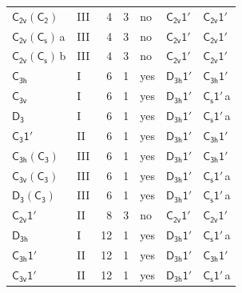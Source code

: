 \documentclass[10pt,a4paper]{article}
\numberwithin{equation}{section}
\newcommand{\grp}[1]{\mathsf{#1}}
\newcommand{\clsletter}[1]{\,{\scriptsize\color{black!55}#1}}
\begin{document}
{\begin{longtable}{@{}llrrlll@{}}
\href{C2v-C2.pdf}{$\grp{C_{2v}}(\grp{C_{2}})$} & III & 4 & 3 & no & \href{C2v-1p.pdf}{$\grp{C_{2v}1'}$} & \href{C2v-1p.pdf}{$\grp{C_{2v}1'}$}\\
\href{C2v-C1v.pdf}{$\grp{C_{2v}}(\grp{C_{s}})$}\clsletter{a} & III & 4 & 3 & no & \href{C2v-1p.pdf}{$\grp{C_{2v}1'}$} & \href{C2v-1p.pdf}{$\grp{C_{2v}1'}$}\\
\href{C2v-C1v.pdf}{$\grp{C_{2v}}(\grp{C_{s}})$}\clsletter{b} & III & 4 & 3 & no & \href{C2v-1p.pdf}{$\grp{C_{2v}1'}$} & \href{C2v-1p.pdf}{$\grp{C_{2v}1'}$}\\
\href{../../../rotation/data/pdf/C3h.pdf}{$\grp{C_{3h}}$} & I & 6 & 1 & yes & \href{D3h-1p.pdf}{$\grp{D_{3h}1'}$} & \href{C3h-1p.pdf}{$\grp{C_{3h}1'}$}\\
\href{../../../rotation/data/pdf/C3v.pdf}{$\grp{C_{3v}}$} & I & 6 & 1 & yes & \href{D3h-1p.pdf}{$\grp{D_{3h}1'}$} & \href{C1v-1p.pdf}{$\grp{C_{s}1'}$}\clsletter{a}\\
\href{../../../rotation/data/pdf/D3.pdf}{$\grp{D_{3}}$} & I & 6 & 1 & yes & \href{D3h-1p.pdf}{$\grp{D_{3h}1'}$} & \href{C1v-1p.pdf}{$\grp{C_{s}1'}$}\clsletter{a}\\
\href{C3-1p.pdf}{$\grp{C_{3}1'}$} & II & 6 & 1 & yes & \href{D3h-1p.pdf}{$\grp{D_{3h}1'}$} & \href{C3h-1p.pdf}{$\grp{C_{3h}1'}$}\\
\href{C3h-C3.pdf}{$\grp{C_{3h}}(\grp{C_{3}})$} & III & 6 & 1 & yes & \href{D3h-1p.pdf}{$\grp{D_{3h}1'}$} & \href{C3h-1p.pdf}{$\grp{C_{3h}1'}$}\\
\href{C3v-C3.pdf}{$\grp{C_{3v}}(\grp{C_{3}})$} & III & 6 & 1 & yes & \href{D3h-1p.pdf}{$\grp{D_{3h}1'}$} & \href{C1v-1p.pdf}{$\grp{C_{s}1'}$}\clsletter{a}\\
\href{D3-C3.pdf}{$\grp{D_{3}}(\grp{C_{3}})$} & III & 6 & 1 & yes & \href{D3h-1p.pdf}{$\grp{D_{3h}1'}$} & \href{C1v-1p.pdf}{$\grp{C_{s}1'}$}\clsletter{a}\\
\href{C2v-1p.pdf}{$\grp{C_{2v}1'}$} & II & 8 & 3 & no & \href{C2v-1p.pdf}{$\grp{C_{2v}1'}$} & \href{C2v-1p.pdf}{$\grp{C_{2v}1'}$}\\
\href{../../../rotation/data/pdf/D3h.pdf}{$\grp{D_{3h}}$} & I & 12 & 1 & yes & \href{D3h-1p.pdf}{$\grp{D_{3h}1'}$} & \href{C1v-1p.pdf}{$\grp{C_{s}1'}$}\clsletter{a}\\
\href{C3h-1p.pdf}{$\grp{C_{3h}1'}$} & II & 12 & 1 & yes & \href{D3h-1p.pdf}{$\grp{D_{3h}1'}$} & \href{C3h-1p.pdf}{$\grp{C_{3h}1'}$}\\
\href{C3v-1p.pdf}{$\grp{C_{3v}1'}$} & II & 12 & 1 & yes & \href{D3h-1p.pdf}{$\grp{D_{3h}1'}$} & \href{C1v-1p.pdf}{$\grp{C_{s}1'}$}\clsletter{a}\\

\end{longtable}}
\end{document}

